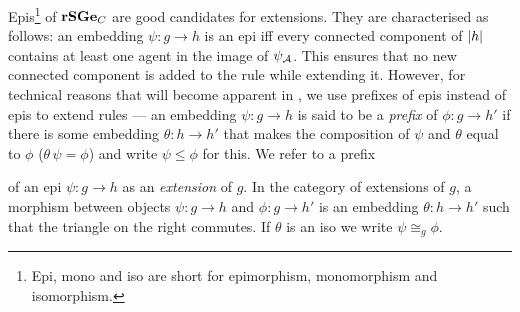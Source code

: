 \pagebreak

Epis\footnote{
  Epi, mono and iso are short for
  epimorphism, monomorphism and isomorphism.}
of $\mathbf{rSGe}_C$ are good candidates for extensions. %
They are characterised as follows:
an embedding $\psi: g \to h$ is an epi iff
every connected component of $\left|h\right|$ contains
at least one agent in the image of $\psi_{\mathcal{A}}$.
This ensures that no new connected component is added to the rule
while extending it.
However, for technical reasons
that will become apparent in ,
we use prefixes of epis
instead of epis to extend rules ---
an embedding $\psi: g \to h$ is said to be
a \emph{prefix} of $\phi: g \to h'$
if there is some embedding $\theta: h \to h'$
that makes the composition of $\psi$ and $\theta$ equal to $\phi$
(\ie $\theta \, \psi = \phi$) %
and write $\psi \leq \phi$ for this.
We refer to a prefix
\begin{wrapfigure}[5]{r}{0.27\textwidth}
  \vspace{-2em}
  \begin{center}
  \end{center}
\end{wrapfigure}
of an epi $\psi: g \to h$ as an \emph{extension} of $g$.
In the category of extensions of $g$,
a morphism between objects $\psi: g \to h$ and $\phi: g \to h'$
is an embedding $\theta: h \to h'$
such that the triangle on the right commutes.
If $\theta$ is an iso we write $\psi \cong_g \phi$.

